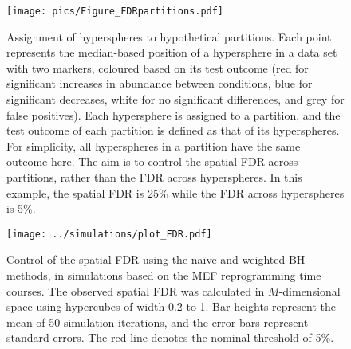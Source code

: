 \documentclass{article}
\newcommand\revised[1]{\textcolor{red}{#1}}
\begin{document}
\begin{figure}[tbp]
    \begin{center}
        \texttt{[image: pics/Figure\_FDRpartitions.pdf]}
    \end{center}
    \caption{Assignment of hyperspheres to hypothetical partitions.
        Each point represents the median-based position of a hypersphere in a data set with two markers, coloured based on its test outcome
        (red for significant increases in abundance between conditions, blue for significant decreases, white for no significant differences, and grey for false positives).
        Each hypersphere is assigned to a partition, and the test outcome of each partition is defined as that of its hyperspheres.
        For simplicity, all hyperspheres in a partition have the same outcome here.
        The aim is to control the spatial FDR across partitions, rather than the FDR across hyperspheres.
        In this example, the spatial FDR is 25\% while the FDR across hyperspheres is 5\%.
}
    \label{fig:fdrdemo}
\end{figure}

\begin{figure}[bt]
    \begin{center}
        \texttt{[image: ../simulations/plot\_FDR.pdf]}
    \end{center}
    \caption{
        Control of the spatial FDR using the na\"ive and weighted BH methods, in simulations based on the MEF reprogramming time courses.
        The observed spatial FDR was calculated in $M$-dimensional space using hypercubes of width 0.2 to 1.
        Bar heights represent the mean of 50 simulation iterations, and the error bars represent standard errors.
        The red line denotes the nominal threshold of 5\%.
    }
    \label{fig:fdr}
\end{figure}

\end{document}
